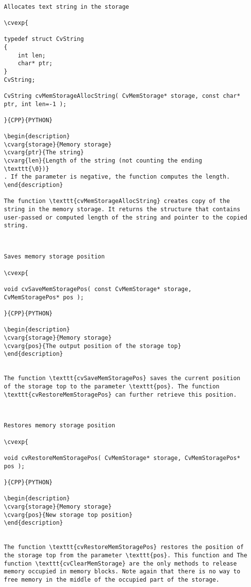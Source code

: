 \label{MemStorageAllocString}
\begin{verbatim}

Allocates text string in the storage

\cvexp{

typedef struct CvString
{
    int len;
    char* ptr;
}
CvString;

CvString cvMemStorageAllocString( CvMemStorage* storage, const char* ptr, int len=-1 );

}{CPP}{PYTHON}

\begin{description}
\cvarg{storage}{Memory storage}
\cvarg{ptr}{The string}
\cvarg{len}{Length of the string (not counting the ending \texttt{\0})}
. If the parameter is negative, the function computes the length.
\end{description}

The function \texttt{cvMemStorageAllocString} creates copy of the string in the memory storage. It returns the structure that contains user-passed or computed length of the string and pointer to the copied string.


\end{verbatim}
\label{SaveMemStoragePos}
\begin{verbatim}

Saves memory storage position

\cvexp{

void cvSaveMemStoragePos( const CvMemStorage* storage, CvMemStoragePos* pos );

}{CPP}{PYTHON}

\begin{description}
\cvarg{storage}{Memory storage}
\cvarg{pos}{The output position of the storage top}
\end{description}


The function \texttt{cvSaveMemStoragePos} saves the current position of the storage top to the parameter \texttt{pos}. The function \texttt{cvRestoreMemStoragePos} can further retrieve this position.


\end{verbatim}
\label{RestoreMemStoragePos}
\begin{verbatim}

Restores memory storage position

\cvexp{

void cvRestoreMemStoragePos( CvMemStorage* storage, CvMemStoragePos* pos );

}{CPP}{PYTHON}

\begin{description}
\cvarg{storage}{Memory storage}
\cvarg{pos}{New storage top position}
\end{description}


The function \texttt{cvRestoreMemStoragePos} restores the position of the storage top from the parameter \texttt{pos}. This function and The function \texttt{cvClearMemStorage} are the only methods to release memory occupied in memory blocks. Note again that there is no way to free memory in the middle of the occupied part of the storage.


\end{verbatim}

